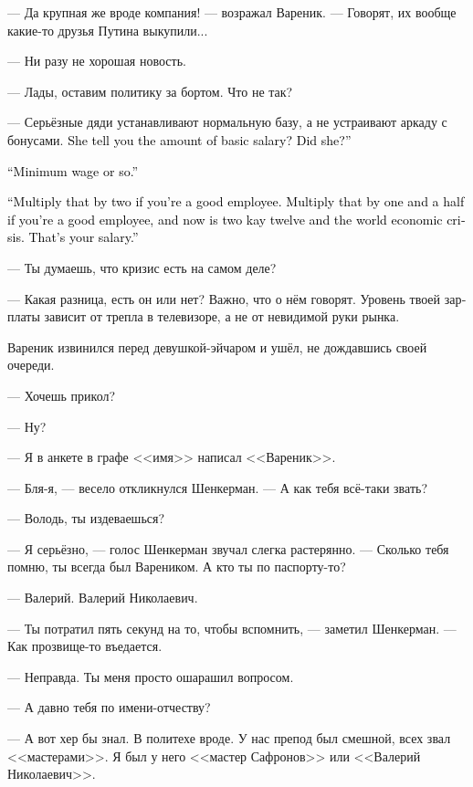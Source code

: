 \documentclass[a5paper,12pt,fleqn]{extbook}\usepackage{cooltooltips}\usepackage{polyglossia}\setdefaultlanguage[babelshorthands=true]{russian}\setotherlanguage{english}\defaultfontfeatures{Ligatures=TeX,Mapping=tex-text} \usepackage{xcolor}\definecolor{lightgray}{HTML}{bbbbbb}\color{lightgray}\newcommand{\ml}[3]{\textenglish{\textcolor{black}{#3}}}
\newcommand{\asterism}{\vspace{1em}{\centering\Large\bfseries$\ast~\ast~\ast$\par}\vspace{1em}}
\newcommand{\textspace}{\vspace{1em}{\centering\Large\bfseries<...>\par}\vspace{1em}}
\begin{document}
--- Да крупная же вроде компания! --- возражал Вареник.
--- Говорят, их вообще какие-то друзья Путина выкупили...

--- Ни разу не хорошая новость.

--- Лады, оставим политику за бортом.
Что не так?

--- Серьёзные дяди устанавливают нормальную базу, а не устраивают аркаду с бонусами.
\ml{$0$}
{Она сказала тебе размер базового оклада?}
{She tell you the amount of basic salary?}
\ml{$0$}
{Сказала?}
{Did she?''}

\ml{$0$}
{--- МРОТ.}
{``Minimum wage or so.''}

\ml{$0$}
{--- Умножь его на два, если ты хороший работник.}
{``Multiply that by two if you're a good employee.}
\ml{$0$}
{Умножь его на полтора, если ты хороший работник, а на дворе две тысячи двенадцатый год и кризис.}
{Multiply that by one and a half if you're a good employee, and now is two kay twelve and the world economic crisis.}
\ml{$0$}
{Вот твоя зарплата.}
{That's your salary.''}

--- Ты думаешь, что кризис есть на самом деле?

--- Какая разница, есть он или нет?
Важно, что о нём говорят.
Уровень твоей зарплаты зависит от трепла в телевизоре, а не от невидимой руки рынка.

Вареник извинился перед девушкой-эйчаром и ушёл, не дождавшись своей очереди.

\asterism

\textspace

--- Хочешь прикол?

--- Ну?

--- Я в анкете в графе <<имя>> написал <<Вареник>>.

--- Бля-я, --- весело откликнулся Шенкерман.
--- А как тебя всё-таки звать?

--- Володь, ты издеваешься?

--- Я серьёзно, --- голос Шенкерман звучал слегка растерянно.
--- Сколько тебя помню, ты всегда был Вареником.
А кто ты по паспорту-то?

--- Валерий.
Валерий Николаевич.

--- Ты потратил пять секунд на то, чтобы вспомнить, --- заметил Шенкерман.
--- Как прозвище-то въедается.

--- Неправда.
Ты меня просто ошарашил вопросом.

--- А давно тебя по имени-отчеству?

--- А вот хер бы знал.
В политехе вроде.
У нас препод был смешной, всех звал <<мастерами>>.
Я был у него <<мастер Сафронов>> или <<Валерий Николаевич>>.
\end{document}
